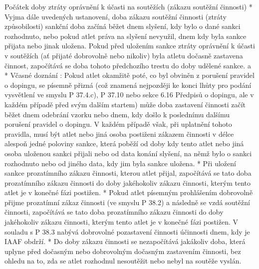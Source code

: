 Počátek doby ztráty oprávnění k účasti na soutěžích (zákazu soutěžní činnosti)
* Vyjma dále uvedených ustanovení, doba zákazu soutěžní činnosti (ztráty způsobilosti) sankční doba začíná běžet dnem slyšení, kdy bylo o dané sankci rozhodnuto, nebo pokud atlet práva na slyšení nevyužil, dnem kdy byla sankce přijata nebo jinak uložena. Pokud před uložením sankce ztráty oprávnění k účasti v soutěžích (ať přijaté dobrovolně nebo nikoliv) byla atletu dočasně zastavena činnost, započítává se doba tohoto předchozího trestu do doby udělené sankce.
  \begitems \style a
  * Včasné doznání : Pokud atlet okamžitě poté, co byl obviněn z porušení pravidel o dopingu, se písemně přizná (což znamená nejpozději ke konci lhůty pro podání vysvětlení ve smyslu P 37.4.c), P 37.10 nebo sekce 6.16 Předpisů o dopingu, ale v každém případě před svým dalším startem) může doba zastavení činnosti začít běžet dnem odebrání vzorku nebo dnem, kdy došlo k poslednímu dalšímu porušení pravidel o dopingu. V každém případě však, při uplatnění tohoto pravidla, musí být atlet nebo jiná osoba postiženi zákazem činnosti v délce alespoň jedné poloviny sankce, která poběží od doby kdy tento atlet nebo jiná osoba uloženou sankci přijali nebo od data konání slyšení, na němž bylo o sankci rozhodnuto nebo od jiného data, kdy jim byla sankce uložena.
  * Při uložení sankce prozatímního zákazu činnosti, kterou atlet přijal, započítává se tato doba prozatímního zákazu činnosti do doby jakéhokoliv zákazu činnosti, kterým tento atlet je v konečné fázi postižen.
  * Pokud atlet písemným prohlášením dobrovolně přijme prozatímní zákaz činnosti (ve smyslu P 38.2) a následně se vzdá soutěžní činnosti, započítává se tato doba prozatímního zákazu činnosti do doby jakéhokoliv zákazu činnosti, kterým tento atlet je v konečné fázi postižen. V souladu s P 38.3 nabývá dobrovolné pozastavení činnosti účinnosti dnem, kdy je IAAF obdrží.
  * Do doby zákazu činnosti se nezapočítává jakákoliv doba, která uplyne před dočasným nebo dobrovolným dočasným zastavením činnosti, bez ohledu na to, zda se atlet rozhodnul nesoutěžit nebo nebyl na soutěže vyslán.
  \enditems

